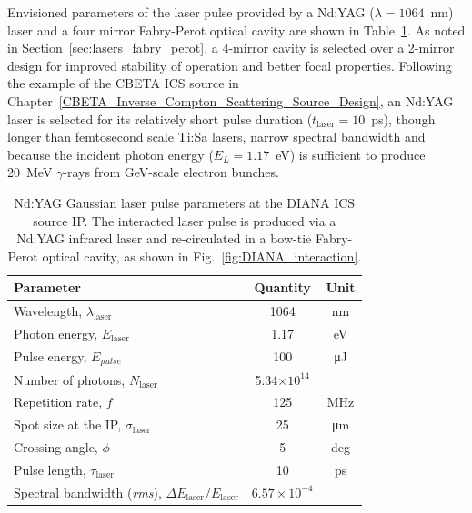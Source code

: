 \documentclass[../main.tex]{subfiles}
\begin{document}
Envisioned parameters of the laser pulse provided by a Nd:YAG ($\lambda = 1064$~\si{\nano\meter}) laser and a four mirror Fabry-Perot optical cavity are shown in Table~\ref{tab:DIANA_laser_pulse_design_parameters}. As noted in Section~\ref{sec:lasers_fabry_perot}, a 4-mirror cavity is selected over a 2-mirror design for improved stability of operation and better focal properties. Following the example of the CBETA ICS source in Chapter~\ref{CBETA_Inverse_Compton_Scattering_Source_Design}, an Nd:YAG laser is selected for its relatively short pulse duration ($t_{\mathrm{laser}}=10$~\si{\pico\second}), though longer than femtosecond scale Ti:Sa lasers, narrow spectral bandwidth and because the incident photon energy ($E_{L}=1.17$~\si{\electronvolt}) is sufficient to produce 20~\si{\mega\electronvolt} $\gamma$-rays from \si{\giga\electronvolt}-scale electron bunches. 
\begin{table}[!h]
\centering
\caption{Nd:YAG Gaussian laser pulse parameters at the DIANA ICS source IP. The interacted laser pulse is produced via a Nd:YAG infrared laser and re-circulated in a bow-tie Fabry-Perot optical cavity, as shown in Fig.~\ref{fig:DIANA_interaction}.}
\vspace{3mm}
\begin{tabular}{lcc}
\hline\hline
Parameter & Quantity & Unit \\
\hline
Wavelength, $\lambda_\textrm{laser}$ & 1064 & \si{\nano\meter}\\
Photon energy, $E_\textrm{laser}$ & 1.17 & \si{\electronvolt}\\
Pulse energy, $E_{pulse}$  & 100 & \si{\micro\joule}\\
Number of photons, $N_{\textrm{laser}}$ & 5.34$\times 10^{14}$ & \\ 
Repetition rate, $f$ & 125 & \si{\mega\hertz}\\
Spot size at the IP, $\sigma_\textrm{laser}$ & 25 & \si{\micro\meter}\\
Crossing angle, $\phi$ & 5 & deg \\
Pulse length, $\tau_{\mathrm{laser}}$  & 10 & \si{\pico\second}\\
Spectral bandwidth (\textit{rms}), $\Delta E_\textrm{laser}/E_\textrm{laser}$ & $6.57\times 10^{-4}$ &   \\
\hline\hline
\end{tabular}
\label{tab:DIANA_laser_pulse_design_parameters}
\end{table}
\end{document}
